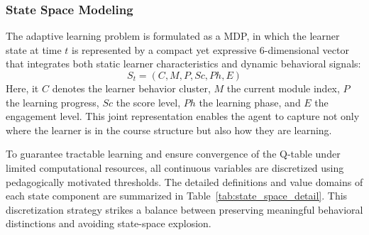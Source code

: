 \documentclass[conference]{IEEEtran}
\begin{document}
\subsubsection{State Space Modeling}
The adaptive learning problem is formulated as a MDP, in which the learner state at time $t$ is represented by a compact yet expressive 6-dimensional vector that integrates both static learner characteristics and dynamic behavioral signals:
\begin{equation}
S_t = (C, M, P, Sc, Ph, E)
\end{equation}
Here, it $C$ denotes the learner behavior cluster, $M$ the current module index, $P$ the learning progress, $Sc$ the score level, $Ph$ the learning phase, and $E$ the engagement level. This joint representation enables the agent to capture not only where the learner is in the course structure but also how they are learning.

To guarantee tractable learning and ensure convergence of the Q-table under limited computational resources, all continuous variables are discretized using pedagogically motivated thresholds. The detailed definitions and value domains of each state component are summarized in Table~\ref{tab:state_space_detail}. This discretization strategy strikes a balance between preserving meaningful behavioral distinctions and avoiding state-space explosion.
\end{document}

